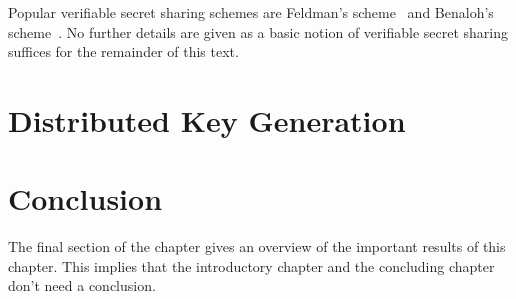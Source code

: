 Popular verifiable secret sharing schemes are Feldman's scheme~\cite{art:Feldman87} and Benaloh's scheme~\cite{art:Benaloh86a}. No further details are given as a basic notion of verifiable secret sharing suffices for the remainder of this text.

\section{Distributed Key Generation}

\section{Conclusion}
The final section of the chapter gives an overview of the important results of this chapter. This implies that the introductory chapter and the concluding chapter don't need a conclusion.

\lipsum[66]

